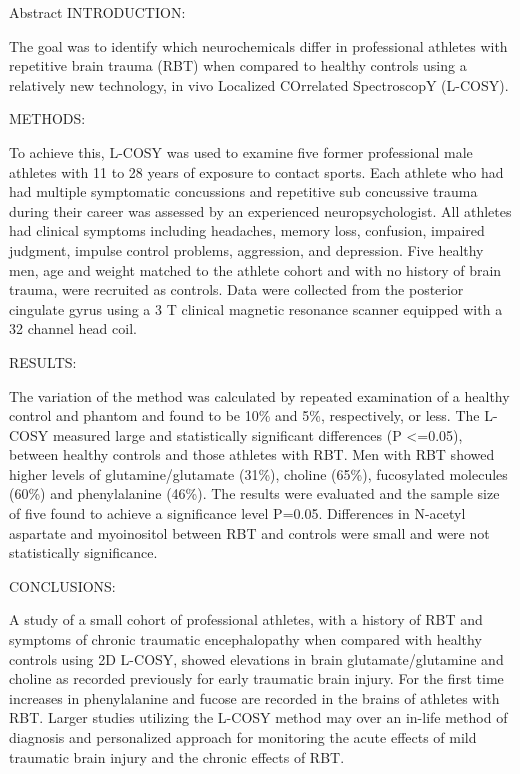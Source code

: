 \documentclass[
]{report}
\begin{document}
Abstract
INTRODUCTION:

The goal was to identify which neurochemicals differ in professional athletes with repetitive brain trauma (RBT) when compared to healthy controls using a relatively new technology, in vivo Localized COrrelated SpectroscopY (L-COSY).

METHODS:

To achieve this, L-COSY was used to examine five former professional male athletes with 11 to 28 years of exposure to contact sports. Each athlete who had had multiple symptomatic concussions and repetitive sub concussive trauma during their career was assessed by an experienced neuropsychologist. All athletes had clinical symptoms including headaches, memory loss, confusion, impaired judgment, impulse control problems, aggression, and depression. Five healthy men, age and weight matched to the athlete cohort and with no history of brain trauma, were recruited as controls. Data were collected from the posterior cingulate gyrus using a 3 T clinical magnetic resonance scanner equipped with a 32 channel head coil.

RESULTS:

The variation of the method was calculated by repeated examination of a healthy control and phantom and found to be 10\% and 5\%, respectively, or less. The L-COSY measured large and statistically significant differences (P \textless=0.05), between healthy controls and those athletes with RBT. Men with RBT showed higher levels of glutamine/glutamate (31\%), choline (65\%), fucosylated molecules (60\%) and phenylalanine (46\%). The results were evaluated and the sample size of five found to achieve a significance level P=0.05. Differences in N-acetyl aspartate and myoinositol between RBT and controls were small and were not statistically significance.

CONCLUSIONS:

A study of a small cohort of professional athletes, with a history of RBT and symptoms of chronic traumatic encephalopathy when compared with healthy controls using 2D L-COSY, showed elevations in brain glutamate/glutamine and choline as recorded previously for early traumatic brain injury. For the first time increases in phenylalanine and fucose are recorded in the brains of athletes with RBT. Larger studies utilizing the L-COSY method may over an in-life method of diagnosis and personalized approach for monitoring the acute effects of mild traumatic brain injury and the chronic effects of RBT.
\end{document}
